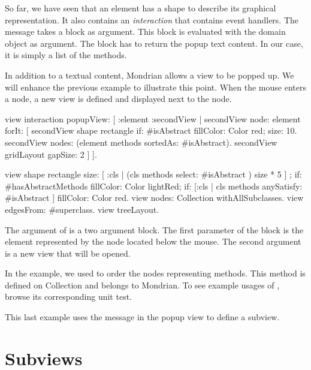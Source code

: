 \documentclass[a4paper,10pt,twoside]{book}
\begin{document}
So far, we have seen that an element has a shape to describe its graphical representation. It also contains an \emph{interaction} that contains event handlers. The message  takes a block as argument. This block is evaluated with the domain object as argument. The block has to return the popup text content. In our case, it is simply a list of the methods.

In addition to a textual content, Mondrian allows a view to be popped up. We will enhance the previous example to illustrate this point. When the mouse enters a node, a new view is defined and displayed next to the node. %

\begin{code}{}
view interaction popupView: [ :element :secondView | 
	secondView node: element forIt: [
	  secondView shape rectangle 
	    if: #isAbstract fillColor: Color red;
	    size: 10.  
	  secondView nodes: (element methods sortedAs: #isAbstract).
	  secondView gridLayout gapSize: 2 
	] ].

view shape rectangle
	size: [ :cls | (cls methods select:  #isAbstract ) size * 5 ] ;
	if: #hasAbstractMethods fillColor: Color lightRed;
	if: [:cls | cls methods anySatisfy: #isAbstract ] fillColor: Color red.
view nodes: Collection withAllSubclasses.
view edgesFrom: #superclass.
view treeLayout.
\end{code}

The argument of  is a two argument block. The first parameter of the block is the element represented by the node located below the mouse. The second argument is a new view that will be opened.

In the example, we used  to order the nodes representing methods. This method is defined on Collection and belongs to Mondrian. To see example usages of , browse its corresponding unit test. %

This last example uses the message  in the popup view to define a subview.


\section{Subviews}
\end{document}
